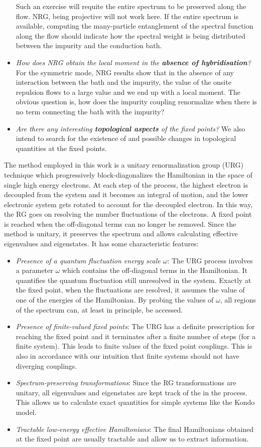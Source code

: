\documentclass[12pt,twoside]{article}
\numberwithin{equation}{section}
\begin{document}
\begin{itemize}
    Such an exercise will requite the entire spectrum to be preserved along the flow. NRG, being projective will not work here. If the entire spectrum is available, computing the many-particle entanglement of the spectral function along the flow should indicate how the spectral weight is being distributed between the impurity and the conduction bath.
    \item \textit{How does NRG obtain the local moment in the \textbf{absence of hybridisation}?}
    For the symmetric mode, NRG results show that in the absence of any interaction between the bath and the impurity, the value of the onsite repulsion flows to a large value and we end up with a local moment. The obvious question is, how does the impurity coupling renormalize when there is no term connecting the bath with the impurity?
    \item \textit{Are there any interesting \textbf{topological aspects} of the fixed points?}
    We also intend to search for the existence of and possible changes in topological quantities at the fixed points.
\end{itemize}
The method employed in this work is a unitary renormalization group (URG) technique which progressively block-diagonalizes the Hamiltonian in the space of single high energy electrons. At each step of the process, the highest electron is decoupled from the system and it becomes an integral of motion, and the lower electronic system gets rotated to account for the decoupled electron. In this way, the RG goes on resolving the number fluctuations of the electrons. A fixed point is reached when the off-diagonal terms can no longer be removed. Since the method is unitary, it preserves the spectrum and allows calculating effective eigenvalues and eigenstates. It has some characteristic features:
\begin{itemize}
    \item \textit{Presence of a quantum fluctuation energy scale \(\omega\)}: 
The URG process involves a parameter \(\omega\) which contains the off-diagonal terms in the Hamiltonian. It quantifies the quantum fluctuation still unresolved in the system. Exactly at the fixed point, when the fluctuations are resolved, it assumes the value of one of the energies of the Hamiltonian. By probing the values of \(\omega\), all regions of the spectrum can, at least in principle, be accessed.
    \item \textit{Presence of finite-valued fixed points}:
The URG has a definite prescription for reaching the fixed point and it terminates after a finite number of steps (for a finite system). This leads to finite values of the fixed point  couplings. This is also in accordance with our intuition that finite systems should not have diverging couplings.
    \item \textit{Spectrum-preserving transformations}:
Since the RG transformations are unitary, all eigenvalues and eigenstates are kept track of the in the process. This allows us to calculate exact quantities for simple systems like the Kondo model.
    \item \textit{Tractable low-energy effective Hamiltonians}:
The final Hamiltonians obtained at the fixed point are usually tractable and allow us to extract information.
\end{itemize}
\end{document}
